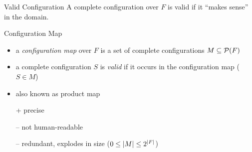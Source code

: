 \begin{frame}{\myframetitle}\label{frame:cfgmap}
	\begin{fancycolumns}
		\begin{note}{Valid Configuration}
			A complete configuration over $F$ is valid if it ``makes sense'' in the domain.
			\emph{\color{red}{$\leadsto$ ``makes sense''?}}
		\end{note}

		\begin{definition}{Configuration Map}
			\begin{itemize}
				\item a \emph{configuration map} over $F$ is a set of complete configurations $M \subseteq \mathcal{P}(F)$
				\item a complete configuration $S$ is \emph{valid} if it occurs in the configuration map ($S \in M$)
				\item also known as product map
				\item[+] precise
				\item[--] not human-readable
				\item[--] redundant, explodes in size ($0 \leq \lvert M\rvert \leq 2^{\lvert F\rvert}$)
			\end{itemize}
		\end{definition}
	\nextcolumn
	\end{fancycolumns}
\end{frame}

